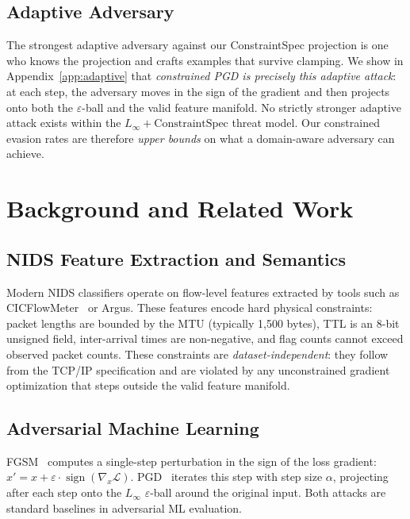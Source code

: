 \documentclass[sigconf,anonymous=true]{acmart}
\begin{document}
\subsection{Adaptive Adversary}
\label{sec:adaptive}

The strongest adaptive adversary against our ConstraintSpec projection
is one who knows the projection and crafts examples that survive
clamping.  We show in Appendix~\ref{app:adaptive} that
\emph{constrained PGD is precisely this adaptive attack}: at each step,
the adversary moves in the sign of the gradient and then projects onto
both the $\varepsilon$-ball and the valid feature manifold.  No strictly
stronger adaptive attack exists within the
$L_\infty + \text{ConstraintSpec}$ threat model.
Our constrained evasion rates are therefore \emph{upper bounds} on what
a domain-aware adversary can achieve.

\section{Background and Related Work}
\label{sec:related}

\subsection{NIDS Feature Extraction and Semantics}

Modern NIDS classifiers operate on flow-level features extracted by
tools such as CICFlowMeter~\cite{lashkari2017cicflowmeter} or Argus.
These features encode hard physical constraints: packet lengths are
bounded by the MTU (typically 1,500 bytes), TTL is an 8-bit unsigned
field, inter-arrival times are non-negative, and flag counts cannot
exceed observed packet counts.  These constraints are
\emph{dataset-independent}: they follow from the TCP/IP specification
and are violated by any unconstrained gradient optimization that steps
outside the valid feature manifold.

\subsection{Adversarial Machine Learning}

FGSM~\cite{goodfellow2015explaining} computes a single-step
perturbation in the sign of the loss gradient:
$x' = x + \varepsilon \cdot \operatorname{sign}(\nabla_x \mathcal{L})$.
PGD~\cite{madry2018towards} iterates this step with step size $\alpha$,
projecting after each step onto the $L_\infty$ $\varepsilon$-ball around
the original input.  Both attacks are standard baselines in adversarial
ML evaluation.
\end{document}
